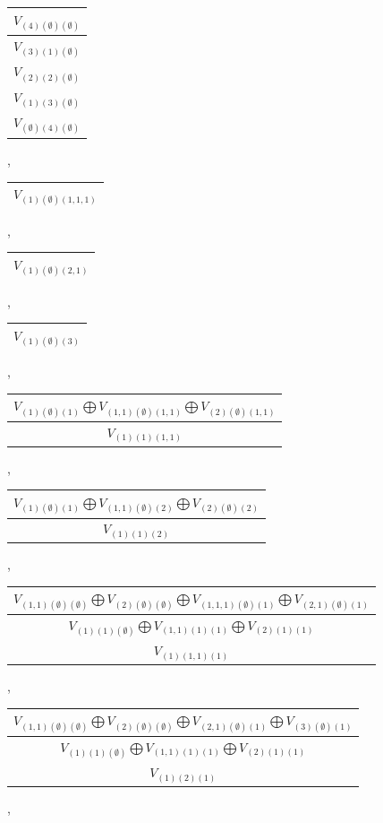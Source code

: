 \documentclass[letterpaper,11pt]{article}
\begin{document}
	\begin{tabular}{| c |}
		\hline
		$V_{(4)(\emptyset)(\emptyset)}$\\
		\hline
		$V_{(3)(1)(\emptyset)}$\\
		\hline
		$V_{(2)(2)(\emptyset)}$\\
		\hline
		$V_{(1)(3)(\emptyset)}$\\
		\hline
		$V_{(\emptyset)(4)(\emptyset)}$\\
		\hline
	\end{tabular}, 
	\begin{tabular}{| c |}
		\hline
		$V_{(1)(\emptyset)(1,1,1)}$\\
		\hline
	\end{tabular}, 
	\begin{tabular}{| c |}
		\hline
		$V_{(1)(\emptyset)(2,1)}$\\
		\hline
	\end{tabular}, 
	\begin{tabular}{| c |}
		\hline
		$V_{(1)(\emptyset)(3)}$\\
		\hline
	\end{tabular}, 
	\newline 
	\begin{tabular}{| c |}
		\hline
		$V_{(1)(\emptyset)(1)}$$\bigoplus$$V_{(1,1)(\emptyset)(1,1)}$$\bigoplus$$V_{(2)(\emptyset)(1,1)}$\\
		\hline
		$V_{(1)(1)(1,1)}$\\
		\hline
	\end{tabular}, 
	\begin{tabular}{| c |}
		\hline
		$V_{(1)(\emptyset)(1)}$$\bigoplus$$V_{(1,1)(\emptyset)(2)}$$\bigoplus$$V_{(2)(\emptyset)(2)}$\\
		\hline
		$V_{(1)(1)(2)}$\\
		\hline
	\end{tabular}, 
	\newline 
	\begin{tabular}{| c |}
		\hline
		$V_{(1,1)(\emptyset)(\emptyset)}$$\bigoplus$$V_{(2)(\emptyset)(\emptyset)}$$\bigoplus$$V_{(1,1,1)(\emptyset)(1)}$$\bigoplus$$V_{(2,1)(\emptyset)(1)}$\\
		\hline
		$V_{(1)(1)(\emptyset)}$$\bigoplus$$V_{(1,1)(1)(1)}$$\bigoplus$$V_{(2)(1)(1)}$\\
		\hline
		$V_{(1)(1,1)(1)}$\\
		\hline
	\end{tabular}, 
	\newline 
	\begin{tabular}{| c |}
		\hline
		$V_{(1,1)(\emptyset)(\emptyset)}$$\bigoplus$$V_{(2)(\emptyset)(\emptyset)}$$\bigoplus$$V_{(2,1)(\emptyset)(1)}$$\bigoplus$$V_{(3)(\emptyset)(1)}$\\
		\hline
		$V_{(1)(1)(\emptyset)}$$\bigoplus$$V_{(1,1)(1)(1)}$$\bigoplus$$V_{(2)(1)(1)}$\\
		\hline
		$V_{(1)(2)(1)}$\\
		\hline
	\end{tabular}, 
\end{document}
